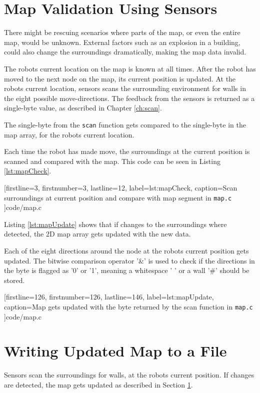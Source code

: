\section{Map Validation Using Sensors}
\label{sec:map_check} %
There might be rescuing scenarios where parts of the map, or even the entire map, would be unknown.
External factors such as an explosion in a building, could also change the surroundings dramatically, making the map data invalid.
 
The robots current location on the map is known at all times. 
After the robot has moved to the next node on the map, its current position is updated.
At the robots current location, sensors scans the surrounding environment for walls in the eight possible move-directions.
The feedback from the sensors is returned as a single-byte value, as described in Chapter \ref{ch:scan}.

The single-byte from the {\tt scan} function gets compared to the single-byte in the map array, for the robots current location.


Each time the robot has made move, the surroundings at the current position is scanned and compared with the map.
This code can be seen in Listing \ref{lst:mapCheck}.
 

[firstline=3,			%
firstnumber=3,		%
lastline=12,			%
label=lst:mapCheck,	%
caption={Scan surroundings at current position and compare with map segment in {\tt map.c}}
]{code/map.c}

Listing \ref{lst:mapUpdate} shows that if changes to the surroundings where
detected, the 2D map array gets updated with the new data. 

Each of the eight directions around the node at the robots current position gets updated.
The bitwise comparison operator '\&' is used to check if the directions in the byte is flagged as '0' or '1',
meaning a whitespace ' ' or a wall '\#' should be stored.


[firstline=126,			%
firstnumber=126,		%
lastline=146,			%
label=lst:mapUpdate,	%
caption={Map gets updated with the byte returned by the scan function in {\tt map.c}}
]{code/map.c}

\section{Writing Updated Map to a File}
\label{sec:map_save} %
Sensors scan the surroundings for walls, at the robots current position.
If changes are detected, the map gets updated as described in Section \ref{sec:map_check}.

